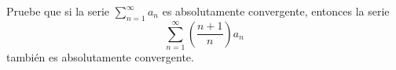 \item Pruebe que si la serie $\displaystyle\sum_{n=1}^\infty a_n$ es absolutamente convergente, entonces la serie
    \[ \sum_{n=1}^\infty \left( \frac{n+1}{n} \right) a_n \]
    también es absolutamente convergente.
